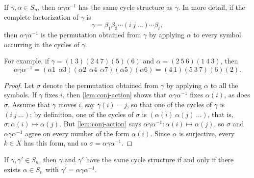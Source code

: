 \begin{proposition}\label{prop:conj-same-structure}
	If \(\gamma, \alpha \in S_n\), then \(\alpha\gamma\alpha^{-1}\) has the same cycle
	structure as \(\gamma\). In more detail, if the complete factorization of \(\gamma\) is
	\[
		\gamma = \beta_1\beta_2 \cdots (i\ j\ \dots) \cdots \beta_t,
	\]
	then \(\alpha\gamma\alpha^{-1}\) is the permutation obtained from \(\gamma\) by applying
	\(\alpha\) to every symbol occurring in the cycles of \(\gamma\).
\end{proposition}

\begin{remark}
	For example, if \(\gamma = (1\ 3)(2\ 4\ 7)(5)(6)\) and
	\(\alpha = (2\ 5\ 6)(1\ 4\ 3)\), then
	\[
		\alpha\gamma\alpha^{-1}
		= (\alpha 1\ \ \alpha 3)(\alpha 2\ \ \alpha 4\ \ \alpha 7)(\alpha 5)(\alpha 6)
		= (4\ 1)(5\ 3\ 7)(6)(2).
	\]
\end{remark}

\begin{proof}
	Let \(\sigma\) denote the permutation obtained from \(\gamma\) by applying \(\alpha\) to
	all the symbols. If \(\gamma\) fixes \(i\), then \autoref{lem:conj-action} shows that
	\(\alpha\gamma\alpha^{-1}\) fixes \(\alpha(i)\), as does \(\sigma\). Assume that
	\(\gamma\) moves \(i\), say \(\gamma(i) = j\), so that one of the cycles of \(\gamma\)
	is \((i\ j\ \dots)\); by definition, one of the cycles of \(\sigma\) is
	\((\alpha(i)\ \alpha(j)\ \dots)\), that is,
	\(\sigma\colon \alpha(i) \mapsto \alpha(j)\). But \autoref{lem:conj-action} says
	\(\alpha\gamma\alpha^{-1}\colon \alpha(i) \mapsto \alpha(j)\), so \(\sigma\) and
	\(\alpha\gamma\alpha^{-1}\) agree on every number of the form \(\alpha(i)\). Since
	\(\alpha\) is surjective, every \(k \in X\) has this form, and so
	\(\sigma = \alpha\gamma\alpha^{-1}\).
\end{proof}

\begin{proposition}\label{prop:conjugacy-criterion}
	If \(\gamma, \gamma' \in S_n\), then \(\gamma\) and \(\gamma'\) have the same cycle
	structure if and only if there exists \(\alpha \in S_n\) with
	\(\gamma' = \alpha\gamma\alpha^{-1}\).
\end{proposition}

